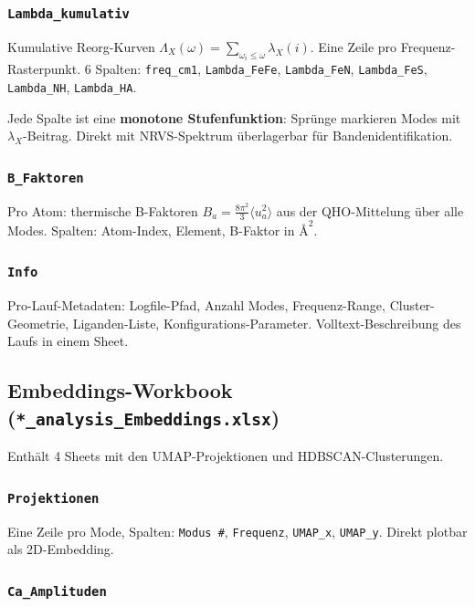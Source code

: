 \documentclass[11pt,a4paper,twoside]{article}
\providecommand{\angstrom}{\text{\AA}}    %
\theoremstyle{remark}
\begin{document}
\subsubsection*{\texttt{Lambda\_kumulativ}}

Kumulative Reorg-Kurven $\Lambda_X(\omega) = \sum_{\omega_i \leq \omega}
\lambda_X(i)$. Eine Zeile pro Frequenz-Rasterpunkt. 6 Spalten:
\texttt{freq\_cm1}, \texttt{Lambda\_FeFe}, \texttt{Lambda\_FeN},
\texttt{Lambda\_FeS}, \texttt{Lambda\_NH}, \texttt{Lambda\_HA}.

Jede Spalte ist eine \textbf{monotone Stufenfunktion}: Spr\"unge
markieren Modes mit $\lambda_X$-Beitrag. Direkt mit NRVS-Spektrum
\"uberlagerbar f\"ur Bandenidentifikation.

\subsubsection*{\texttt{B\_Faktoren}}

Pro Atom: thermische B-Faktoren $B_a = \frac{8\pi^2}{3} \langle u_a^2
\rangle$ aus der QHO-Mittelung \"uber alle Modes. Spalten: Atom-Index,
Element, B-Faktor in $\angstrom^2$.

\subsubsection*{\texttt{Info}}

Pro-Lauf-Metadaten: Logfile-Pfad, Anzahl Modes, Frequenz-Range,
Cluster-Geometrie, Liganden-Liste, Konfigurations-Parameter.
Volltext-Beschreibung des Laufs in einem Sheet.

\subsection{Embeddings-Workbook
            (\texttt{*\_analysis\_Embeddings.xlsx})}
\label{app:wb-embeddings}

Enth\"alt 4 Sheets mit den UMAP-Projektionen und HDBSCAN-Clusterungen.

\subsubsection*{\texttt{Projektionen}}

Eine Zeile pro Mode, Spalten: \texttt{Modus \#}, \texttt{Frequenz},
\texttt{UMAP\_x}, \texttt{UMAP\_y}. Direkt plotbar als 2D-Embedding.

\subsubsection*{\texttt{Ca\_Amplituden}}
\end{document}
